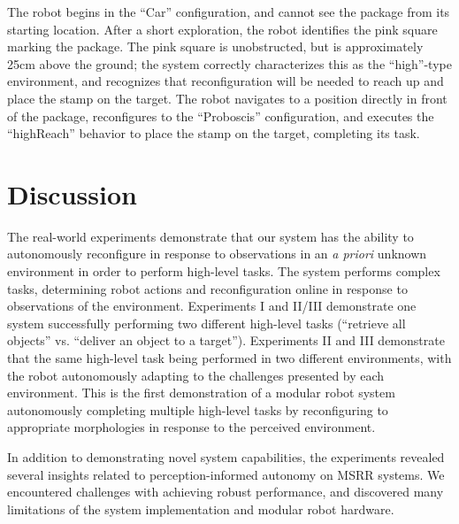 \documentclass[journal]{IEEEtran}
\begin{document}
The robot begins in the ``Car'' configuration, and cannot see the package from its starting location.  After a short exploration, the robot identifies the pink square marking the package.  The pink square is unobstructed, but is approximately 25cm above the ground; the system correctly characterizes this as the ``high''-type environment, and recognizes that reconfiguration will be needed to reach up and place the stamp on the target.  The robot navigates to a position directly in front of the package, reconfigures to the ``Proboscis'' configuration, and executes the ``highReach'' behavior to place the stamp on the target, completing its task.
%
\section{Discussion}
\label{sec:discussion}
The real-world experiments demonstrate that our system has the ability to autonomously reconfigure in response to observations in an \textit{a priori} unknown environment in order to perform high-level tasks. The system performs complex tasks, determining robot actions and reconfiguration online in response to observations of the environment. Experiments I and II/III demonstrate one system successfully performing two different high-level tasks (``retrieve all objects'' vs. ``deliver an object to a target''). Experiments II and III demonstrate that the same high-level task being performed in two different environments, with the robot autonomously adapting to the challenges presented by each environment. This is the first demonstration of a modular robot system autonomously completing multiple high-level tasks by reconfiguring to appropriate morphologies in response to the perceived environment.

In addition to demonstrating novel system capabilities, the experiments revealed several insights related to perception-informed autonomy on MSRR systems. We encountered challenges with achieving robust performance, and discovered many limitations of the system implementation and modular robot hardware. %
%
\end{document}
